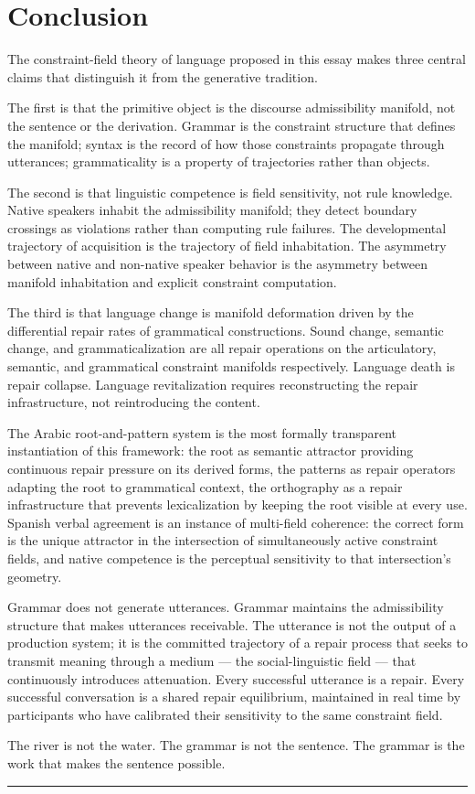 \documentclass[11pt, a4paper]{article}
\theoremstyle{definition}
\theoremstyle{remark}
\begin{document}
\section{Conclusion}

The constraint-field theory of language proposed in this essay makes three
central claims that distinguish it from the generative tradition.

The first is that the primitive object is the discourse admissibility manifold,
not the sentence or the derivation. Grammar is the constraint structure that
defines the manifold; syntax is the record of how those constraints propagate
through utterances; grammaticality is a property of trajectories rather than
objects.

The second is that linguistic competence is field sensitivity, not rule
knowledge. Native speakers inhabit the admissibility manifold; they detect
boundary crossings as violations rather than computing rule failures. The
developmental trajectory of acquisition is the trajectory of field inhabitation.
The asymmetry between native and non-native speaker behavior is the asymmetry
between manifold inhabitation and explicit constraint computation.

The third is that language change is manifold deformation driven by the
differential repair rates of grammatical constructions. Sound change, semantic
change, and grammaticalization are all repair operations on the articulatory,
semantic, and grammatical constraint manifolds respectively. Language death
is repair collapse. Language revitalization requires reconstructing the repair
infrastructure, not reintroducing the content.

The Arabic root-and-pattern system is the most formally transparent
instantiation of this framework: the root as semantic attractor providing
continuous repair pressure on its derived forms, the patterns as repair
operators adapting the root to grammatical context, the orthography as
a repair infrastructure that prevents lexicalization by keeping the root
visible at every use. Spanish verbal agreement is an instance of multi-field
coherence: the correct form is the unique attractor in the intersection of
simultaneously active constraint fields, and native competence is the
perceptual sensitivity to that intersection's geometry.

Grammar does not generate utterances. Grammar maintains the admissibility
structure that makes utterances receivable. The utterance is not the output
of a production system; it is the committed trajectory of a repair process
that seeks to transmit meaning through a medium --- the social-linguistic
field --- that continuously introduces attenuation. Every successful
utterance is a repair. Every successful conversation is a shared repair
equilibrium, maintained in real time by participants who have calibrated
their sensitivity to the same constraint field.

The river is not the water. The grammar is not the sentence. The grammar
is the work that makes the sentence possible.

\bigskip

\noindent\rule{0.4\textwidth}{0.4pt}

\vspace{0.5em}
\end{document}
